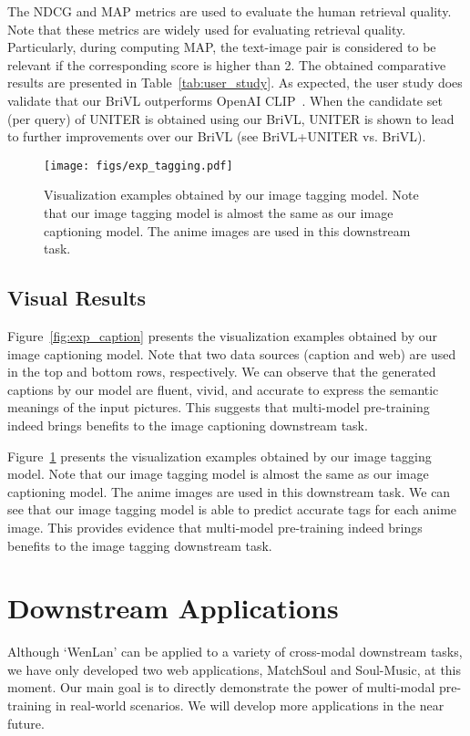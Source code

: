 \documentclass[10pt,twocolumn,letterpaper]{article}
\begin{document}
The NDCG and MAP metrics are used to evaluate the human retrieval quality. Note that these metrics are widely used for evaluating retrieval quality. Particularly, during computing MAP, the text-image pair is considered to be relevant if the corresponding score is higher than 2. The obtained comparative results are presented in Table~\ref{tab:user_study}. As expected, the user study does validate that our BriVL outperforms OpenAI CLIP~\cite{radford2021learning}. When the candidate set (per query) of UNITER is obtained using our BriVL, UNITER is shown to lead to further improvements over our BriVL (see BriVL+UNITER vs. BriVL).

\begin{figure}[t]
    \centering
    \texttt{[image: figs/exp\_tagging.pdf]}
\caption{
    Visualization examples obtained by our image tagging model. Note that our image tagging model is almost the same as our image captioning model. The anime images are used in this downstream task.}
    \label{fig:exp_tagging}
\end{figure}

\subsection{Visual Results}

Figure~\ref{fig:exp_caption} presents the visualization  examples obtained by our image captioning model. Note that two data sources (caption and web) are used in the top and bottom rows, respectively. We can observe that the generated captions by our model are fluent, vivid, and accurate to express the semantic meanings of the input pictures. This suggests that multi-model pre-training indeed brings benefits to the image captioning downstream task.

Figure~\ref{fig:exp_tagging} presents the visualization examples obtained by our image tagging model. Note that our image tagging model is almost the same as our image captioning model. The anime images are used in this downstream task. We can see that our image tagging model is able to predict accurate tags for each anime image. This provides evidence that multi-model pre-training indeed brings benefits to the image tagging downstream task.

\section{Downstream Applications}

Although `WenLan' can be applied to a variety of cross-modal downstream tasks, we have only developed two web applications, MatchSoul and Soul-Music, at this moment. Our main goal is to directly demonstrate the power of multi-modal pre-training in real-world scenarios. We will develop more applications in the near future.
\end{document}
